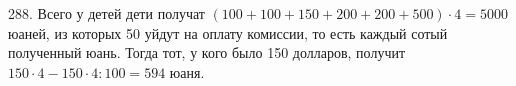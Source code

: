 288. Всего у детей дети получат $(100+100+150+200+200+500)\cdot4=5000$ юаней, из которых 50 уйдут на оплату комиссии, то есть каждый сотый полученный юань. Тогда тот, у кого было 150 долларов, получит $150\cdot4-150\cdot4:100=594$ юаня.\\
